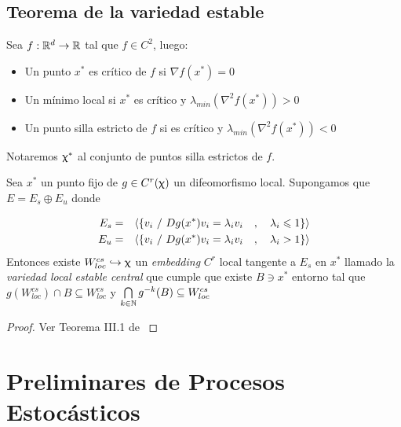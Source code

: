 \subsection{Teorema de la variedad estable}

\begin{definition}
	Sea $f : {\mathbb{R}}^d \rightarrow {\mathbb{R}}$ tal que $f \in C^2$, luego:
	
	\begin{itemize}
		\item Un punto $x^*$ es cr\'itico de $f$  si $\nabla f(x^*) = 0$
		\item Un m\'inimo local si $x^*$ es cr\'itico y $\lambda_{min} \left(\nabla ^2 f(x^*)\right) > 0$
		\item Un punto silla estricto de $f$ si es cr\'itico y $\lambda_{min} \left(\nabla ^2 f(x^*)\right) < 0$ 
	\end{itemize}
	
	Notaremos $\upchi^*$ al conjunto de puntos silla estrictos de $f$.
	
\end{definition}

\begin{theorem}
	\label{teo: variedad local estable central}
	Sea $x^*$ un punto fijo de $g \in C^{r}(\upchi)$ un difeomorfismo local. Supongamos que $E = E_s \oplus E_u$ donde 
	
	\begin{equation*}
	\begin{aligned}
	E_s & = & \langle \left\lbrace v_i \ / \ Dg(x^*)v_i = \lambda_i v_i \quad , \quad \lambda_i \leqslant 1\right\rbrace \rangle \\
	E_u & = & \langle \left\lbrace v_i \ / \ Dg(x^*)v_i = \lambda_i v_i \quad , \quad \lambda_i > 1\right\rbrace \rangle \\
	\end{aligned}
	\end{equation*}
	Entonces existe $W_{loc}^{cs} \hookrightarrow \upchi$ un \textit{embedding} $C^r$ local tangente a $E_s$ en $x^*$ llamado la \textit{variedad local estable central} que cumple que existe $B \ni x^*$ entorno tal que $g\left(W_{loc}^{cs}\right) \cap B \subseteq W_{loc}^{cs}$ y $\bigcap\limits_{k \in {\mathbb{N}}}{g^{-k}(B)} \subseteq W_{loc}^{cs}$
\end{theorem}

\begin{proof}
	Ver Teorema III.1 de \cite{schub:1987}
\end{proof}

\section{Preliminares de Procesos Estoc\'asticos}

